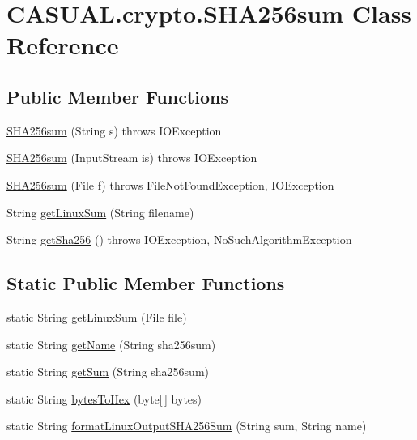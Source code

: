 \hypertarget{classCASUAL_1_1crypto_1_1SHA256sum}{\section{C\-A\-S\-U\-A\-L.\-crypto.\-S\-H\-A256sum Class Reference}
\label{classCASUAL_1_1crypto_1_1SHA256sum}
}
\subsection*{Public Member Functions}
\begin{DoxyCompactItemize}
\item 
\hyperlink{classCASUAL_1_1crypto_1_1SHA256sum_afc1d07faf79184606a8af15153c430e2}{S\-H\-A256sum} (String s)  throws I\-O\-Exception 
\item 
\hyperlink{classCASUAL_1_1crypto_1_1SHA256sum_ac400cc047e8571a90385f233a4ac15b6}{S\-H\-A256sum} (Input\-Stream is)  throws I\-O\-Exception 
\item 
\hyperlink{classCASUAL_1_1crypto_1_1SHA256sum_ad4848f903e6697b02b6232305eb0c958}{S\-H\-A256sum} (File f)  throws File\-Not\-Found\-Exception, I\-O\-Exception 
\item 
String \hyperlink{classCASUAL_1_1crypto_1_1SHA256sum_aac8a59bd709fff8830cbde5f522c4154}{get\-Linux\-Sum} (String filename)
\item 
String \hyperlink{classCASUAL_1_1crypto_1_1SHA256sum_a8deae101346f9a0a66ca8c3b0d2db1df}{get\-Sha256} ()  throws I\-O\-Exception, No\-Such\-Algorithm\-Exception 
\end{DoxyCompactItemize}
\subsection*{Static Public Member Functions}
\begin{DoxyCompactItemize}
\item 
static String \hyperlink{classCASUAL_1_1crypto_1_1SHA256sum_a54c94bb634aeea42b0bf8705afc7a8fb}{get\-Linux\-Sum} (File file)
\item 
static String \hyperlink{classCASUAL_1_1crypto_1_1SHA256sum_a0f1178a4624b6576e5f7e56b2a2df813}{get\-Name} (String sha256sum)
\item 
static String \hyperlink{classCASUAL_1_1crypto_1_1SHA256sum_ac56c9bd745fb0e31abb7a88acd2f8f35}{get\-Sum} (String sha256sum)
\item 
static String \hyperlink{classCASUAL_1_1crypto_1_1SHA256sum_a69c267e92b86486de7152159ff51d26c}{bytes\-To\-Hex} (byte\mbox{[}$\,$\mbox{]} bytes)
\item 
static String \hyperlink{classCASUAL_1_1crypto_1_1SHA256sum_a68756d611d2cb8c028dfc57e1b2d4128}{format\-Linux\-Output\-S\-H\-A256\-Sum} (String sum, String name)
\end{DoxyCompactItemize}
